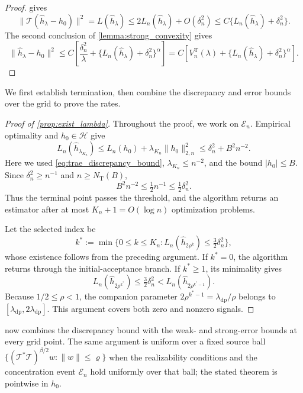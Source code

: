 \begin{proof}
 gives
\[
\|\mathcal T(\hat h_\lambda-h_0)\|^2=L(\hat h_\lambda)
\leqslant 2L_n(\hat h_\lambda)+O(\delta_n^2)
\leqslant C \{L_n(\hat h_\lambda)+\delta_n^2\}.
\]
The second conclusion of \cref{lemma:strong_convexity} gives
\[
\|\hat h_\lambda-h_0\|^2
\leqslant C\left[\frac{\delta_n^2}{\lambda}
+\{L_n(\hat h_\lambda)+\delta_n^2\}^{\alpha}\right]
=C\left[V_n^{\mathrm T}(\lambda)
+\{L_n(\hat h_\lambda)+\delta_n^2\}^\alpha\right].
\]
\end{proof}
We first establish termination, then combine the discrepancy and error bounds over the grid to prove the rates.

\begin{proof}[Proof of \cref{prop:exist_lambda}]
Throughout the proof, we work on $\mathcal E_n$. Empirical optimality and $h_0\in\mathcal H$ give
\[
L_n(\hat h_{\lambda_{K_n}})\leqslant L_n(h_0)+\lambda_{K_n}\|h_0\|_{2,n}^2
\leqslant\delta_n^2+B^2n^{-2}.
\]
Here we used \eqref{eq:trae_discrepancy_bound}, $\lambda_{K_n}\leqslant n^{-2}$, and the bound $|h_0|\leqslant B$. Since $\delta_n^2\geqslant n^{-1}$ and $n\geqslant N_{\mathrm T}(B)$,
\[
B^2n^{-2}\leqslant\tfrac12 n^{-1} \leqslant\tfrac12\delta_n^2.
\]
Thus the terminal point passes the threshold, and the algorithm returns an estimator after at most $K_n+1=O(\log n)$ optimization problems.

Let the selected index be
\[
k^*:=\min\{0\leqslant k\leqslant K_n:L_n(\hat h_{2\rho^k})\leqslant \tfrac32\delta_n^2\},
\]
whose existence follows from the preceding argument. If $k^*=0$, the algorithm returns through the initial-acceptance branch. If $k^*\geqslant1$, its minimality gives
\[
L_n(\hat h_{2\rho^{k^*}}) \leqslant \tfrac32\delta_n^2 < L_n(\hat h_{2\rho^{k^*-1}}).
\]
Because $1/2\leqslant\rho<1$, the companion parameter $2\rho^{k^*-1}=\lambda_{\mathrm{dp}}/\rho$ belongs to $[\lambda_{\mathrm{dp}},2\lambda_{\mathrm{dp}}]$. This argument covers both zero and nonzero signals.

\end{proof}

 now combines the discrepancy bound with the weak- and strong-error bounds at every grid point. The same argument is uniform over a fixed source ball $\{(\mathcal T^*\mathcal T)^{\beta/2}w:\|w\|\leqslant \varrho\}$ when the realizability conditions and the concentration event $\mathcal E_n$ hold uniformly over that ball; the stated theorem is pointwise in $h_0$.


